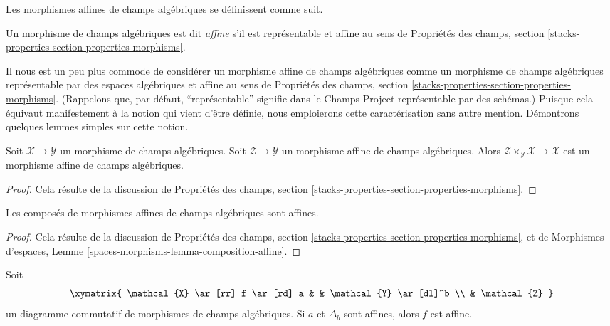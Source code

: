 \noindent
Les morphismes affines de champs algébriques se définissent comme suit.

\begin{definition}
\label{definition-affine}
Un morphisme de champs algébriques est dit {\it affine} s'il est représentable
et affine au sens de Propriétés des champs, section
\ref{stacks-properties-section-properties-morphisms}.
\end{definition}

\noindent
Il nous est un peu plus commode de considérer un morphisme affine de champs
algébriques comme un morphisme de champs algébriques représentable par des
espaces algébriques et affine au sens de Propriétés des champs, section
\ref{stacks-properties-section-properties-morphisms}.
(Rappelons que, par défaut, ``représentable'' signifie dans le Champs Project
représentable par des schémas.) Puisque cela équivaut manifestement à la notion
qui vient d'être définie, nous emploierons cette caractérisation sans autre
mention. Démontrons quelques lemmes simples sur cette notion.

\begin{lemma}
\label{lemma-base-change-affine}
Soit $\mathcal{X} \to \mathcal{Y}$ un morphisme de champs algébriques.
Soit $\mathcal{Z} \to \mathcal{Y}$ un morphisme affine de champs algébriques.
Alors $\mathcal{Z} \times_\mathcal{Y} \mathcal{X} \to \mathcal{X}$ est un
morphisme affine de champs algébriques.
\end{lemma}

\begin{proof}
Cela résulte de la discussion de Propriétés des champs, section
\ref{stacks-properties-section-properties-morphisms}.
\end{proof}

\begin{lemma}
\label{lemma-composition-affine}
Les composés de morphismes affines de champs algébriques sont affines.
\end{lemma}

\begin{proof}
Cela résulte de la discussion de Propriétés des champs, section
\ref{stacks-properties-section-properties-morphisms}, et de Morphismes
d'espaces, Lemme \ref{spaces-morphisms-lemma-composition-affine}.
\end{proof}

\begin{lemma}
\label{lemma-affine-permanence}
Soit
$$
\xymatrix{
\mathcal{X} \ar[rr]_f \ar[rd]_a & & \mathcal{Y} \ar[dl]^b \\
& \mathcal{Z}
}
$$
un diagramme commutatif de morphismes de champs algébriques.
Si $a$ et $\Delta_b$ sont affines, alors $f$ est affine.
\end{lemma}

